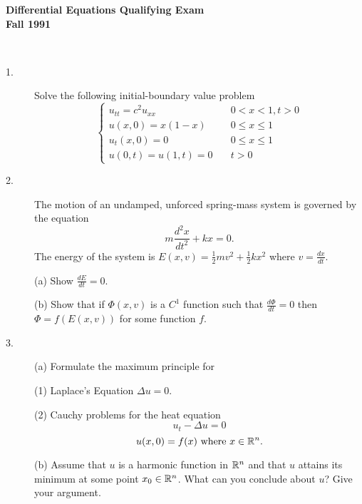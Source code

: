 \documentclass{article}
\begin{document}






\begin{center}\begin{LARGE}
{\bf Differential Equations Qualifying Exam}\\ 
{\bf Fall 1991}\\ \end{LARGE}
\end{center}
\vspace{0.1in}
\noindent\hrulefill\\

\begin{description}
\item[1.]
Solve the following initial-boundary value problem
$$\begin{cases}
        u_{tt} = c^2 u_{xx} \quad &0 < x < 1, t>0\\
        u(x,0) = x(1-x)  \quad &0 \leq x \leq 1 \\
        u_t(x,0) = 0   \quad &0 \leq x \leq 1 \\
        u(0,t) = u(1,t) = 0  \quad &t >0
        \end{cases}$$

\item[2.]
The motion of an undamped, unforced spring-mass system is governed by
the equation
$$m \frac{d^2x}{dt^2} + kx = 0.$$
The energy of the system is $E(x,v) = \frac{1}{2} mv^2 + \frac{1}{2} kx^2$
where $v=\frac{dx}{dt}$.

\item[\quad] (a)
Show $\frac{dE}{dt} = 0$.

\item[\quad] (b)
Show that if $\Phi (x,v)$ is a $C^1$ function such that $\frac{d \Phi}{dt} =0$
then $\Phi = f(E(x,v))$ for some function $f$.

\item[3.] (a)
Formulate the maximum principle for

\item[\qquad] (1)
Laplace's Equation $\Delta u = 0$.

\item[\qquad] (2)
Cauchy problems for the heat equation
$$u_t - \Delta u = 0$$
$$u(x,0) = f(x) \hbox{\ where\ } x \in \Bbb R^n.$$

\item[\quad] (b)
Assume that $u$ is a harmonic function in $\Bbb R^n$ and that $u$ attains its
minimum at some point $x_0 \in \Bbb R^n$. What can you conclude about $u$?
Give your argument.


\end{description}
\end{document}
